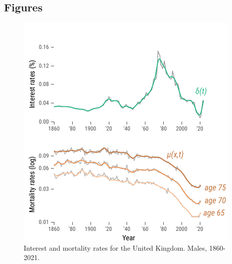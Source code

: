 \documentclass[12pt]{article}
\begin{document}
\subsection{Figures}
\begin{figure}[!ht]
	\centering
	\includegraphics[width=0.6\linewidth]{Fig/interestMortalityRates}
	\caption{{Interest and mortality rates for the United Kingdom. Males, 1860-2021.}}
	\label{fig:Fig1}
\end{figure}
\end{document}
